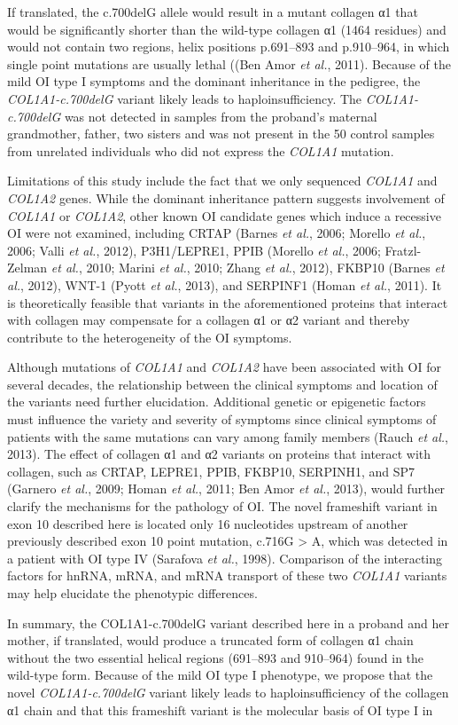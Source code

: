 If translated, the c.700delG allele would result in a mutant collagen α1 that would be significantly shorter than the wild-type collagen α1 (1464 residues) and would not contain two regions, helix positions p.691–893 and p.910–964, in which single point mutations are usually lethal ((Ben Amor \textit{et al.}, 2011). Because of the mild OI type I symptoms and the dominant inheritance in the pedigree, the \textit{COL1A1-c.700delG} variant likely leads to haploinsufficiency. The \textit{COL1A1-c.700delG} was not detected in samples from the proband’s maternal grandmother, father, two sisters and was not present in the 50 control samples from unrelated individuals who did not express the \textit{COL1A1} mutation.\par Limitations of this study include the fact that we only sequenced \textit{COL1A1} and \textit{COL1A2} genes. While the dominant inheritance pattern suggests involvement of \textit{COL1A1} or \textit{COL1A2}, other known OI candidate genes which induce a recessive OI were not examined, including CRTAP (Barnes \textit{et al.}, 2006; Morello \textit{et al.}, 2006; Valli \textit{et al.}, 2012), P3H1/LEPRE1, PPIB (Morello \textit{et al.}, 2006; Fratzl-Zelman \textit{et al.}, 2010; Marini \textit{et al.}, 2010; Zhang \textit{et al.}, 2012), FKBP10 (Barnes \textit{et al.}, 2012), WNT-1 (Pyott \textit{et al.}, 2013), and SERPINF1 (Homan \textit{et al.}, 2011). It is theoretically feasible that variants in the aforementioned proteins that interact with collagen may compensate for a collagen α1 or α2 variant and thereby contribute to the heterogeneity of the OI symptoms.\par Although mutations of \textit{COL1A1} and \textit{COL1A2} have been associated with OI for several decades, the relationship between the clinical symptoms and location of the variants need further elucidation. Additional genetic or epigenetic factors must influence the variety and severity of symptoms since clinical symptoms of patients with the same mutations can vary among family members (Rauch \textit{et al.}, 2013). The effect of collagen α1 and α2 variants on proteins that interact with collagen, such as CRTAP, LEPRE1, PPIB, FKBP10, SERPINH1, and SP7 (Garnero \textit{et al.}, 2009; Homan \textit{et al.}, 2011; Ben Amor \textit{et al.}, 2013), would further clarify the mechanisms for the pathology of OI. The novel frameshift variant in exon 10 described here is located only 16 nucleotides upstream of another previously described exon 10 point mutation, c.716G > A, which was detected in a patient with OI type IV (Sarafova \textit{et al.}, 1998). Comparison of the interacting factors for hnRNA, mRNA, and mRNA transport of these two \textit{COL1A1} variants may help elucidate the phenotypic differences.\par In summary, the COL1A1-c.700delG variant described here in a proband and her mother, if translated, would produce a truncated form of collagen α1 chain without the two essential helical regions (691–893 and 910–964) found in the wild-type form. Because of the mild OI type I phenotype, we propose that the novel \textit{COL1A1-c.700delG} variant likely leads to haploinsufficiency of the collagen α1 chain and that this frameshift variant is the molecular basis of OI type I in 